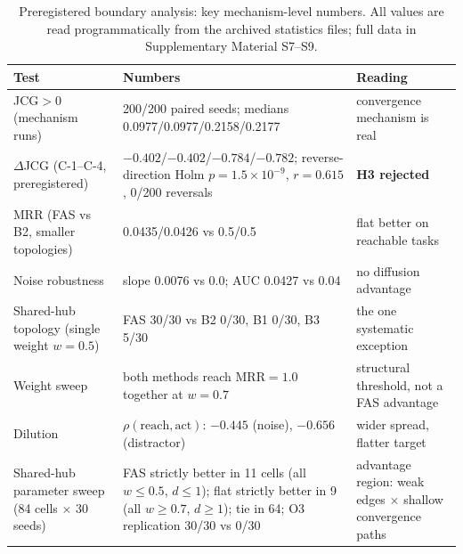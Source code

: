 \documentclass[10pt]{article}
\begin{document}
\begin{table}[t]
\centering\small
\caption{Preregistered boundary analysis: key mechanism-level numbers. All values are read programmatically from the archived statistics files; full data in Supplementary Material S7--S9.}
\label{tab:boundary}
\begin{tabular}{L{4.4cm}L{6.6cm}L{3.4cm}}
\toprule
\textbf{Test} & \textbf{Numbers} & \textbf{Reading} \\
\midrule
JCG${>}0$ (mechanism runs) & 200/200 paired seeds; medians 0.0977/0.0977/0.2158/0.2177 & convergence mechanism is real \\
$\Delta$JCG (C-1--C-4, preregistered) & ${-}0.402$/${-}0.402$/${-}0.784$/${-}0.782$; reverse-direction Holm $p{=}1.5\times10^{-9}$, $r{=}0.615$, 0/200 reversals & \textbf{H3 rejected} \\
MRR (FAS vs B2, smaller topologies) & 0.0435/0.0426 vs 0.5/0.5 & flat better on reachable tasks \\
Noise robustness & slope 0.0076 vs 0.0; AUC 0.0427 vs 0.04 & no diffusion advantage \\
Shared-hub topology (single weight $w{=}0.5$) & FAS 30/30 vs B2 0/30, B1 0/30, B3 5/30 & the one systematic exception \\
Weight sweep & both methods reach MRR${=}1.0$ together at $w{=}0.7$ & structural threshold, not a FAS advantage \\
Dilution & $\rho(\mathrm{reach},\mathrm{act})$: $-0.445$ (noise), $-0.656$ (distractor) & wider spread, flatter target \\
Shared-hub parameter sweep (84 cells $\times$ 30 seeds) & FAS strictly better in 11 cells (all $w{\le}0.5$, $d{\le}1$); flat strictly better in 9 (all $w{\ge}0.7$, $d{\ge}1$); tie in 64; O3 replication 30/30 vs 0/30 & advantage region: weak edges $\times$ shallow convergence paths \\
\bottomrule
\end{tabular}
\end{table}
\end{document}
